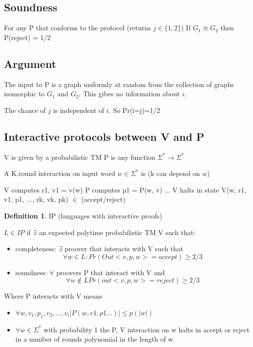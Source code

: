 \documentclass[a4paper,12pt]{article}
\theoremstyle{definition}
\newtheorem{definition}[counter]{Definition}
\theoremstyle{remark}
\begin{document}
\subsection*{Soundness}
For any P that conforms to the protocol (returns $j \in \{1, 2\}$)
If $G_1 \cong G_2$ then P(reject) = 1/2

\subsection*{Argument}
The input to P is a graph uniformly at random from the collection of graphs isomorphic to $G_1$ and $G_2$.
This gibes no information about $i$.

The chance of $j$ is independent of $i$.
So Pr(i=j)=1/2

\subsection{Interactive protocols between V and P}
V is given by a probabilistic TM
P is any function $\Sigma^* \to \Sigma^*$

A K.round interaction on input word $w \in \Sigma^*$ is (k can depend on $w$)

V computes r1, v1 = v(w)
P computes p1 = P(w, v)
...
V halts in state V(w, r1, v1, p1, ..., rk, vk, pk) $\in$ (accept/reject)

\begin{definition}
    IP (languages with interactive proofs)

    $L \in IP $ if $\exists$ an expected polytime probabilistic TM V such that:
    \begin{itemize}
        \item completeness:
        $\exists$ proover that interacts with V such that
        \begin{equation*}
            \forall w \in L: Pr(Out<v,p,w>=accept) \geq 2/3
        \end{equation*}
        \item soundness:
        $\forall$ proovers P that interact with V and
        \begin{equation*}
            \forall w \notin L Pr(out<v,p,w>=reject) \geq 2/3
        \end{equation*}
    \end{itemize}

\end{definition}

Where P interacts with V means
\begin{itemize}
    \item $\forall w, v_1, p_1, v_2, \dots, v_i | P(w, v1, p1 \dots) | \leq p(|w|)$
    \item $\forall w \in \Sigma^* $ with probability 1 the P, V interaction on w halts in accept or reject in a number of rounds 
    polynomial in the length of w.
\end{itemize}
\end{document}

